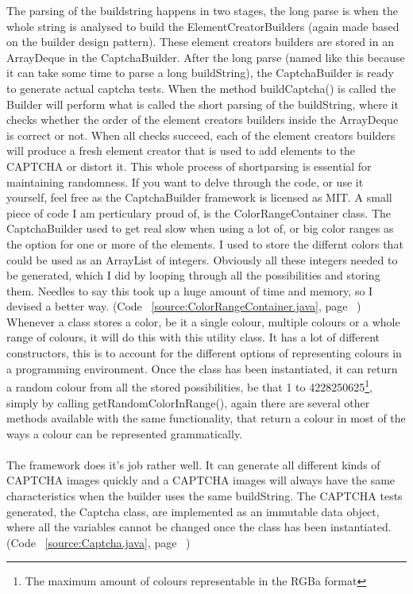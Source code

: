 \documentclass[pdftex,a4paper,12pt,twoside]{report}
\theoremstyle{plain} \newtheorem{theorem}{Theorem} \newtheorem{proposition}{Proposition} \newtheorem{lemma}{Lemma} \newtheorem*{corollary}{Corollary}
\theoremstyle{definition} \newtheorem{definition}{Definition} \newtheorem{conjecture}{Conjecture} \newtheorem*{example}{Example} \newtheorem{algorithm}{Algorithm}
\theoremstyle{remark} \newtheorem*{remark}{Remark} \newtheorem*{note}{Note} \newtheorem{case}{Case}
\begin{document}
The parsing of the buildstring happens in two stages, the long parse is when the whole string is analysed to build the ElementCreatorBuilders (again made based on the builder design pattern). These element creators builders are stored in an ArrayDeque in the CaptchaBuilder. After the long parse (named like this because it can take some time to parse a long buildString), the CaptchaBuilder is ready to generate actual captcha tests. When the method buildCaptcha() is called the Builder will perform what is called the short parsing of the buildString, where it checks whether the order of the element creators builders inside the ArrayDeque is correct or not. When all checks succeed, each of the element creators builders will produce a fresh element creator that is used to add elements to the CAPTCHA or distort it. This whole process of shortparsing is essential for maintaining randomness. If you want to delve through the code, or use it yourself, feel free as the CaptchaBuilder framework is licensed as MIT. A small piece of code I am perticulary proud of, is the ColorRangeContainer class. The CaptchaBuilder used to get real slow when using a lot of, or big color ranges as the option for one or more of the elements. I used to store the differnt colors that could be used as an ArrayList of integers. Obviously all these integers needed to be generated, which I did by looping through all the possibilities and storing them. Needles to say this took up a huge amount of time and memory, so I devised a better way. (Code ~\ref{source:ColorRangeContainer.java}, page ~\pageref{source:ColorRangeContainer.java})
Whenever a class stores a color, be it a single colour, multiple colours or a whole range of colours, it will do this with this utility class. It has a lot of different constructors, this is to account for the different options of representing colours in a programming environment. Once the class has been instantiated, it can return a random colour from all the stored possibilities, be that 1 to 4228250625\footnote{The maximum amount of colours representable in the RGBa format}, simply by calling getRandomColorInRange(), again there are several other methods available with the same functionality, that return a colour in most of the ways a colour can be represented grammatically.\\\\
The framework does it's job rather well. It can generate all different kinds of CAPTCHA images quickly and a CAPTCHA images will always have the same characteristics when the builder uses the same buildString. The CAPTCHA tests generated, the Captcha class, are implemented as an immutable data object, where all the variables cannot be changed once the class has been instantiated. (Code ~\ref{source:Captcha.java}, page ~\pageref{source:Captcha.java})
\end{document}
